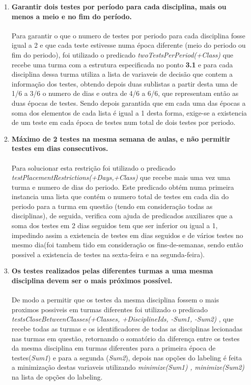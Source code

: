 \documentclass{llncs}
\begin{document}
\begin{enumerate}

	\item \textbf{Garantir dois testes por período para cada disciplina, mais ou menos a meio e no fim do período.}\\\\
		Para garantir o que o numero de testes por periodo para cada disciplina fosse igual a 2 e que cada teste estivesse numa época diferente (meio do periodo ou fim do periodo), foi utilizado o predicado 	               
		\textit{twoTestsPerPeriod(+Class)} que recebe uma turma com a estrutura especificada no ponto  \textbf{3.1} e para cada disciplina dessa turma utiliza a lista de variaveis de decisão que contem a informação dos 
		testes, obtendo depois duas sublistas a partir desta uma de 1/6  a 3/6  o numero de dias e outra de 4/6 a 6/6, que representam então as duas épocas de testes.
		Sendo depois garantida que em cada uma das épocas a soma dos elementos de cada lista é igual a 1 desta forma, exige-se a existencia de um teste em cada época de testes num total de dois testes por periodo.
		\\
	
\newpage
			
	\item \textbf{Máximo de 2 testes na mesma semana de aulas, e não permitir testes em dias consecutivos.} \\\\
		Para solucionar esta restrição foi utilizado o predicado \textit{testPlacementRestrictions(+Days,+Class)}  que recebe mais uma vez uma turma e numero de dias do periodo.
		Este predicado obtém numa primeira instancia uma lista que contém o numero total de testes em cada dia do periodo para a turma em questão (tendo em consideração todas as disciplinas), de seguida, verifica 
		com ajuda de predicados auxiliares que a soma dos testes em 2 dias seguidos tem que ser inferior ou igual a 1, impedindo assim a existencia de testes em dias seguidos e de vários testes no mesmo dia(foi tambem 
		tido em consideração os fins-de-semanas, sendo então possivel a existencia de testes na sexta-feira e na segunda-feira).
		\\

	\item \textbf{Os testes realizados pelas diferentes turmas a uma mesma disciplina devem ser o mais próximos possível.} \\\\
		De modo a permitir que os testes da mesma disciplina fossem o mais proximos possiveis em turmas diferentes foi utilizado o predicado  \textit{testsCloseBetweenClasses(+Classes, +DisciplineIds, -Sum1, -Sum2)} , 
		que recebe todas as turmas e os identificadores de todas as disciplinas lecionadas nas turmas em questão, retornando o somatório da diferença entre os testes da mesma disciplina em turmas diferentes para a 
		primeira época de testes(\textit{Sum1}) e para a segunda 
		(\textit{Sum2}), depois nas opções do labeling é feita a minimização destas variaveis utilizando \textit{minimize(Sum1) , minimize(Sum2)} na lista de opções do labeling.
		\\


\end{enumerate}
\end{document}
